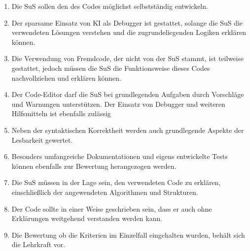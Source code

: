 \documentclass[a4paper,12pt]{article}
\begin{document}
\begin{enumerate}[label=\S\ \arabic*]
    \item Die SuS sollen den des Codes möglichst selbstständig entwickeln.
    \item Der sparsame Einsatz von KI als Debugger ist gestattet, solange die SuS die verwendeten Lösungen verstehen und die zugrundeliegenden Logiken erklären können.
    \item Die Verwendung von Fremdcode, der nicht von der SuS stammt, ist teilweise gestattet, jedoch müssen die SuS die Funktionsweise dieses Codes nachvollziehen und erklären können.
    \item Der Code-Editor darf die SuS bei grundlegenden Aufgaben durch Vorschläge und Warnungen unterstützen. Der Einsatz von Debugger und weiteren Hilfsmitteln ist ebenfalls zulässig
    \item Neben der syntaktischen Korrektheit werden auch grundlegende Aspekte der Lesbarkeit gewertet.
    \item Besonders umfangreiche Dokumentationen und eigens entwickelte Tests können ebenfalls zur Bewertung herangezogen werden.
    \item Die SuS müssen in der Lage sein, den verwendeten Code zu erklären, einschließlich der angewendeten Algorithmen und Strukturen.
    \item Der Code sollte in einer Weise geschrieben sein, dass er auch ohne Erklärungen weitgehend verstanden werden kann.
    \item Die Bewertung ob die Kriterien im Einzelfall eingehalten wurden, behält sich die Lehrkraft vor.
\end{enumerate}
\end{document}
